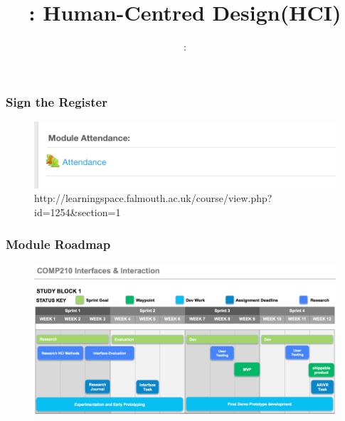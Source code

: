 \usepackage{../../beamerthemeFalmouthGamesAcademy}
\usepackage{multimedia}
\usepackage{soul}
\usepackage{tikz}
\usepackage{verbatim}
\graphicspath{ {../../} }
\usepackage{csquotes}
\usepackage{hyperref}
\hypersetup{
    colorlinks=true,
    linkcolor=blue,
    filecolor=magenta,      
    urlcolor=cyan,
}


\usepackage[normalem]{ulem}
\usepackage{wasysym}

\usepackage{pdfpages}

\usetikzlibrary{arrows,automata}




\title{\sessionnumber: \normalsize{Human-Centred Design(HCI)}}
\subtitle{\modulecode: \moduletitle}

\frame{\titlepage} 

\begin{frame}
	\frametitle{Sign the Register}
	\begin{figure}
		\includegraphics[scale=.5]{assets/attendance}
		\caption{\tiny{http://learningspace.falmouth.ac.uk/course/view.php?id=1254\&section=1 }}
	\end{figure}
\end{frame}

\begin{frame}
	\frametitle{Module Roadmap}
	\begin{figure}
		\includegraphics[scale=.36]{assets/roadmap}
	\end{figure}
\end{frame}


